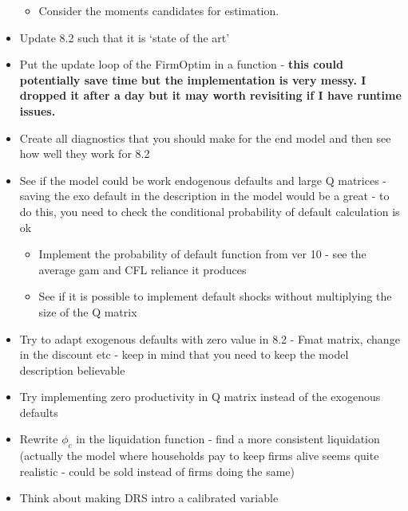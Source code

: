 \documentclass[12pt]{article}
\begin{document}
\begin{itemize}
\begin{itemize}
        \item Consider the moments candidates for estimation. \checkmark
    \end{itemize}
    \item Update 8.2 such that it is `state of the art' \checkmark
    \item Put the update loop of the FirmOptim in a function - \textbf{this could potentially save time but the implementation is very messy. I dropped it after a day but it may worth revisiting if I have runtime issues.} \checkmark
    \item Create all diagnostics that you should make for the end model and then see how well they work for 8.2 \checkmark
    \item See if the model could be work endogenous defaults and large Q matrices - saving the exo default in the description in the model would be a great - to do this, you need to check the conditional probability of default calculation is ok \checkmark
    \begin{itemize}
        \item Implement the probability of default function from ver 10 - see the average gam and CFL reliance it produces \checkmark
        \item See if it is possible to implement default shocks without multiplying the size of the Q matrix \checkmark
    \end{itemize}
    \item Try to adapt exogenous defaults with zero value in 8.2 - Fmat matrix, change in the discount etc - keep in mind that you need to keep the model description believable \checkmark
    \item Try implementing zero productivity in Q matrix instead of the exogenous defaults  \checkmark
    \item Rewrite $\phi_c$ in the liquidation function - find a more consistent liquidation (actually the model where households pay to keep firms alive seems quite realistic - could be sold instead of firms doing the same) \checkmark
    \item Think about making DRS intro a calibrated variable \checkmark
\end{itemize} \normalsize
\newpage
\end{document}
